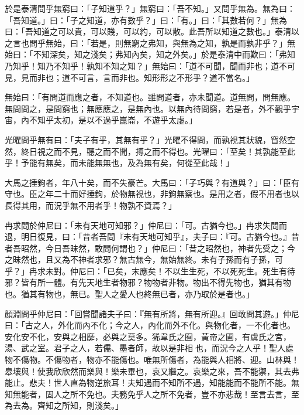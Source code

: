 \begin{pinyinscope}
於是泰清問乎無窮曰：「子知道乎？」無窮曰：「吾不知。」又問乎無為。無為曰：「吾知道。」曰：「子之知道，亦有數乎？」曰：「有。」曰：「其數若何？」無為曰：「吾知道之可以貴，可以賤，可以約，可以散。此吾所以知道之數也。」泰清以之言也問乎無始，曰：「若是，則無窮之弗知，與無為之知，孰是而孰非乎？」無始曰：「不知深矣，知之淺矣；弗知內矣，知之外矣。」於是泰清中而歎曰：「弗知乃知乎！知乃不知乎！孰知不知之知？」無始曰：「道不可聞，聞而非也；道不可見，見而非也；道不可言，言而非也。知形形之不形乎？道不當名。」

無始曰：「有問道而應之者，不知道也。雖問道者，亦未聞道。道無問，問無應。無問問之，是問窮也；無應應之，是無內也。以無內待問窮，若是者，外不觀乎宇宙，內不知乎太初，是以不過乎崑崙，不遊乎太虛。」

光曜問乎無有曰：「夫子有乎，其無有乎？」光曜不得問，而孰視其狀貌，窅然空然，終日視之而不見，聽之而不聞，搏之而不得也。光曜曰：「至矣！其孰能至此乎！予能有無矣，而未能無無也，及為無有矣，何從至此哉！」

大馬之捶鉤者，年八十矣，而不失豪芒。大馬曰：「子巧與？有道與？」曰：「臣有守也。臣之年二十而好捶鉤，於物無視也，非鉤無察也。是用之者，假不用者也以長得其用，而況乎無不用者乎！物孰不資焉？」

冉求問於仲尼曰：「未有天地可知邪？」仲尼曰：「可。古猶今也。」冉求失問而退，明日復見，曰：「昔者吾問『未有天地可知乎』，夫子曰：『可。古猶今也。』昔者吾昭然，今日吾昧然，敢問何謂也？」仲尼曰：「昔之昭然也，神者先受之；今之昧然也，且又為不神者求邪？無古無今，無始無終。未有子孫而有子孫，可乎？」冉求未對。仲尼曰：「已矣，末應矣！不以生生死，不以死死生。死生有待邪？皆有所一體。有先天地生者物邪？物物者非物。物出不得先物也，猶其有物也。猶其有物也，無已。聖人之愛人也終無已者，亦乃取於是者也。」

顏淵問乎仲尼曰：「回嘗聞諸夫子曰：『無有所將，無有所迎。』回敢問其遊。」仲尼曰：「古之人，外化而內不化；今之人，內化而外不化。與物化者，一不化者也。安化安不化，安與之相靡，必與之莫多。狶韋氏之囿，黃帝之圃，有虞氏之宮，湯、武之室。君子之人，若儒、墨者師，故以是非相𩐋也，而況今之人乎！聖人處物不傷物。不傷物者，物亦不能傷也。唯無所傷者，為能與人相將、迎。山林與！皋壤與！使我欣欣然而樂與！樂未畢也，哀又繼之。哀樂之來，吾不能禦，其去弗能止。悲夫！世人直為物逆旅耳！夫知遇而不知所不遇，知能能而不能所不能。無知無能者，固人之所不免也。夫務免乎人之所不免者，豈不亦悲哉！至言去言，至為去為。齊知之所知，則淺矣。」


\end{pinyinscope}